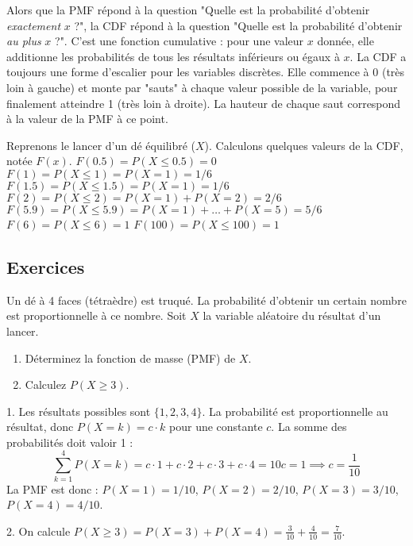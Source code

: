 \begin{intuitionbox}
Alors que la PMF répond à la question "Quelle est la probabilité d'obtenir \textit{exactement} $x$ ?", la CDF répond à la question "Quelle est la probabilité d'obtenir \textit{au plus} $x$ ?". C'est une fonction cumulative : pour une valeur $x$ donnée, elle additionne les probabilités de tous les résultats inférieurs ou égaux à $x$.
La CDF a toujours une forme d'escalier pour les variables discrètes. Elle commence à 0 (très loin à gauche) et monte par "sauts" à chaque valeur possible de la variable, pour finalement atteindre 1 (très loin à droite). La hauteur de chaque saut correspond à la valeur de la PMF à ce point.
\end{intuitionbox}

\begin{examplebox}
Reprenons le lancer d'un dé équilibré ($X$). Calculons quelques valeurs de la CDF, notée $F(x)$.
\newline
$F(0.5) = P(X \le 0.5) = 0$
\newline
$F(1) = P(X \le 1) = P(X=1) = 1/6$
\newline
$F(1.5) = P(X \le 1.5) = P(X=1) = 1/6$
\newline
$F(2) = P(X \le 2) = P(X=1) + P(X=2) = 2/6$
\newline
$F(5.9) = P(X \le 5.9) = P(X=1) + \dots + P(X=5) = 5/6$
\newline
$F(6) = P(X \le 6) = 1$
\newline
$F(100) = P(X \le 100) = 1$
\end{examplebox}

\subsection{Exercices}

\begin{exercicebox}
Un dé à 4 faces (tétraèdre) est truqué. La probabilité d'obtenir un certain nombre est proportionnelle à ce nombre. Soit $X$ la variable aléatoire du résultat d'un lancer.
\begin{enumerate}
    \item Déterminez la fonction de masse (PMF) de $X$.
    \item Calculez $P(X \ge 3)$.
\end{enumerate}
\end{exercicebox}

\begin{correctionbox}
1. Les résultats possibles sont $\{1, 2, 3, 4\}$. La probabilité est proportionnelle au résultat, donc $P(X=k) = c \cdot k$ pour une constante $c$.
La somme des probabilités doit valoir 1 :
$$ \sum_{k=1}^{4} P(X=k) = c \cdot 1 + c \cdot 2 + c \cdot 3 + c \cdot 4 = 10c = 1 \implies c = \frac{1}{10} $$
La PMF est donc : $P(X=1)=1/10$, $P(X=2)=2/10$, $P(X=3)=3/10$, $P(X=4)=4/10$.

2. On calcule $P(X \ge 3) = P(X=3) + P(X=4) = \frac{3}{10} + \frac{4}{10} = \frac{7}{10}$.
\end{correctionbox}

